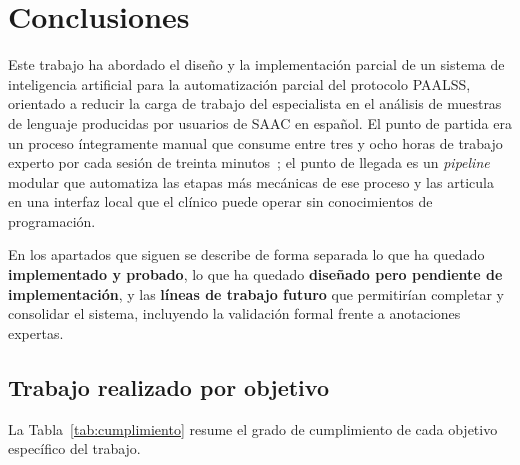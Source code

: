 \chapter{Conclusiones}
\label{chap:conclusiones}

Este trabajo ha abordado el diseño y la implementación parcial de un sistema de
inteligencia artificial para la automatización parcial del protocolo \ac{PAALSS},
orientado a reducir la carga de trabajo del especialista en el análisis de muestras
de lenguaje producidas por usuarios de \ac{SAAC} en español. El punto de partida era
un proceso íntegramente manual que consume entre tres y ocho horas de trabajo experto
por cada sesión de treinta minutos~\cite{soto2020protocolo}; el punto de llegada es un
\emph{pipeline} modular que automatiza las etapas más mecánicas de ese proceso y las
articula en una interfaz local que el clínico puede operar sin conocimientos de
programación.

En los apartados que siguen se describe de forma separada lo que ha quedado
\textbf{implementado y probado}, lo que ha quedado \textbf{diseñado pero pendiente de
implementación}, y las \textbf{líneas de trabajo futuro} que permitirían completar y
consolidar el sistema, incluyendo la validación formal frente a anotaciones expertas.


\section{Trabajo realizado por objetivo}
\label{sec:conclusiones_oe}

La Tabla~\ref{tab:cumplimiento} resume el grado de cumplimiento de cada objetivo
específico del trabajo.

